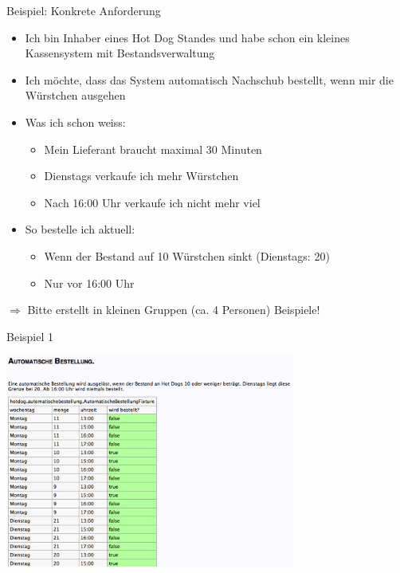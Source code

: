 \begin{frame}{Beispiel: Konkrete Anforderung}

\begin{itemize}
	\item Ich bin Inhaber eines Hot Dog Standes und habe schon ein kleines Kassensystem mit Bestandsverwaltung
	\item Ich möchte, dass das System automatisch Nachschub bestellt, wenn mir die Würstchen ausgehen
	
	\item Was ich schon weiss:
	\begin{itemize}
		\item Mein Lieferant braucht maximal 30 Minuten
		\item Dienstags verkaufe ich mehr Würstchen
		\item Nach 16:00 Uhr verkaufe ich nicht mehr viel
	\end{itemize}
	
	\item So bestelle ich aktuell:
	\begin{itemize}
		\item Wenn der Bestand auf 10 Würstchen sinkt (Dienstags: 20)
		\item Nur vor 16:00 Uhr
	\end{itemize}
\end{itemize}
	
$\Rightarrow$ Bitte erstellt in kleinen Gruppen (ca. 4 Personen) Beispiele!

\end{frame}


\begin{frame}{Beispiel 1}

\begin{center}
\includegraphics[height=7cm]{SchlechtesBeispiel.png} \newline
\end{center}

\end{frame}

